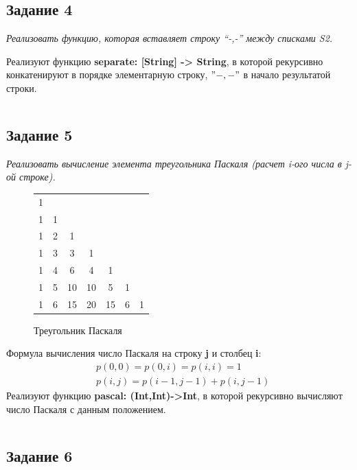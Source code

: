 \documentclass[12pt]{article} %
\begin{document}
\inputminted[firstline = 36, lastline = 38, frame= single]{Haskell}{F:/git/FuncProg/Assignment1/Assign1.hs}

\subsection{Задание 4}

\textit{
Реализовать функцию, которая вставляет строку “-,-” между списками S2. 
}

Реализуют функцию \textbf{separate: [String] -> String}, в которой рекурсивно конкатенируют в порядке элементарную строку, $"-,-"$ в начало результатой строки. 

\inputminted[firstline = 41, lastline = 43, frame= single]{Haskell}{F:/git/FuncProg/Assignment1/Assign1.hs}

\subsection{Задание 5}

\textit{
Реализовать вычисление элемента треугольника Паскаля (расчет i-ого числа в j-ой строке).
}
\begin{figure}[H]
\begin{center}
\begin{tabular}{ccccccc}
1\\
1 & 1\\
1 & 2 & 1\\
1 & 3 & 3 & 1\\
1 & 4 & 6 & 4 & 1\\
1 & 5 & 10 & 10 & 5 & 1\\
1 & 6 & 15 & 20 & 15 & 6 & 1\\
\end{tabular}
\caption{Треугольник Паскаля}
\end{center}
\end{figure}

Формула вычисления число Паскаля на строку \textbf{j} и столбец \textbf{i}:
\[ \begin{aligned}& p(0,0) = p (0,i) = p (i,i) = 1 \\
 & p(i,j) = p(i-1,j-1) + p(i,j -1)\end{aligned}\]
Реализуют функцию \textbf{pascal: (Int,Int)->Int}, в которой рекурсивно вычисляют число Паскаля с данным положением. 

\inputminted[firstline = 48, lastline = 53, frame= single]{Haskell}{F:/git/FuncProg/Assignment1/Assign1.hs}

\subsection{Задание 6}
\end{document}
